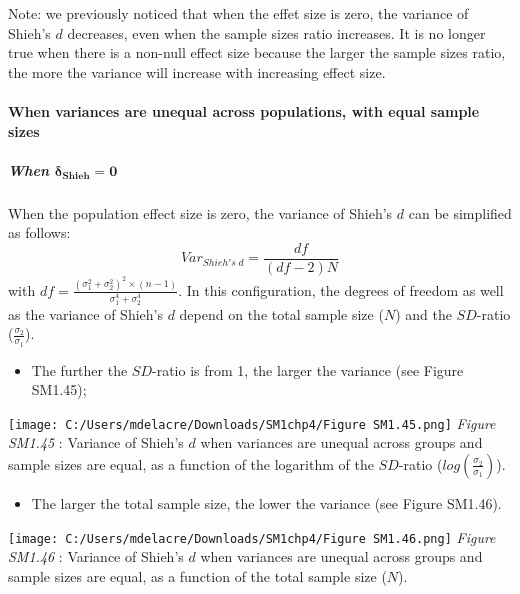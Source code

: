 \documentclass[
  english,
  man,mask,floatsintext]{apa6}
\providecommand{\tightlist}{%
  \setlength{\itemsep}{0pt}\setlength{\parskip}{0pt}}
\let\oldparagraph\paragraph
\renewcommand{\paragraph}[1]{\oldparagraph{#1}\mbox{}}
\let\oldsubparagraph\subparagraph
\renewcommand{\subparagraph}[1]{\oldsubparagraph{#1}\mbox{}}
\begin{document}
Note: we previously noticed that when the effet size is zero, the variance of Shieh's \(d\) decreases, even when the sample sizes ratio increases. It is no longer true when there is a non-null effect size because the larger the sample sizes ratio, the more the variance will increase with increasing effect size.

\hypertarget{when-variances-are-unequal-across-populations-with-equal-sample-sizes-4}{%
\paragraph{When variances are unequal across populations, with equal sample sizes}\label{when-variances-are-unequal-across-populations-with-equal-sample-sizes-4}}

\hypertarget{when-bmdelta_shieh-0-1}{%
\subparagraph{\texorpdfstring{When \(\bm{\delta_{Shieh} = 0}\)}{When \textbackslash bm\{\textbackslash delta\_\{Shieh\} = 0\}}}\label{when-bmdelta_shieh-0-1}}

When the population effect size is zero, the variance of Shieh's \(d\) can be simplified as follows:
\[Var_{Shieh's \; d} = \frac{df}{(df-2)N}\]
with \(df = \frac{(\sigma_1^2+\sigma_2^2)^2 \times (n-1)}{\sigma_1^4+\sigma_2^4}\). In this configuration, the degrees of freedom as well as the variance of Shieh's \(d\) depend on the total sample size (\(N\)) and the \(SD\)-ratio (\(\frac{\sigma_2}{\sigma_1}\)).

\begin{itemize}
\tightlist
\item
  The further the \(SD\)-ratio is from 1, the larger the variance (see Figure SM1.45);
\end{itemize}

\texttt{[image: C:/Users/mdelacre/Downloads/SM1chp4/Figure SM1.45.png]}
\emph{Figure SM1.45} : Variance of Shieh's \(d\) when variances are unequal across groups and sample sizes are equal, as a function of the logarithm of the \(SD\)-ratio (\(log \left( \frac{\sigma_2}{\sigma_1} \right)\)).

\begin{itemize}
\tightlist
\item
  The larger the total sample size, the lower the variance (see Figure SM1.46).
\end{itemize}

\texttt{[image: C:/Users/mdelacre/Downloads/SM1chp4/Figure SM1.46.png]}
\emph{Figure SM1.46} : Variance of Shieh's \(d\) when variances are unequal across groups and sample sizes are equal, as a function of the total sample size (\(N\)).
\end{document}
